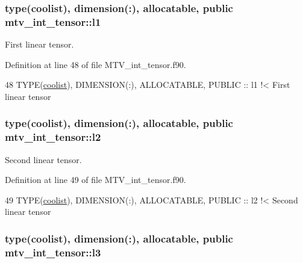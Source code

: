 \subsubsection[{\texorpdfstring{l1}{l1}}]{\setlength{\rightskip}{0pt plus 5cm}type({\bf coolist}), dimension(\+:), allocatable, public mtv\+\_\+int\+\_\+tensor\+::l1}\hypertarget{namespacemtv__int__tensor_a2dbd181e62dbbb9aedcbd6535ca56ec5}{}\label{namespacemtv__int__tensor_a2dbd181e62dbbb9aedcbd6535ca56ec5}


First linear tensor. 



Definition at line 48 of file M\+T\+V\+\_\+int\+\_\+tensor.\+f90.


\begin{DoxyCode}
48   \textcolor{keywordtype}{TYPE}(\hyperlink{structtensor_1_1coolist}{coolist}), \textcolor{keywordtype}{DIMENSION(:)}, \textcolor{keywordtype}{ALLOCATABLE}, \textcolor{keywordtype}{PUBLIC} :: l1\textcolor{comment}{   !< First linear tensor}
\end{DoxyCode}
\subsubsection[{\texorpdfstring{l2}{l2}}]{\setlength{\rightskip}{0pt plus 5cm}type({\bf coolist}), dimension(\+:), allocatable, public mtv\+\_\+int\+\_\+tensor\+::l2}\hypertarget{namespacemtv__int__tensor_aa6dcec8a4783e982cd8894a15ae210d4}{}\label{namespacemtv__int__tensor_aa6dcec8a4783e982cd8894a15ae210d4}


Second linear tensor. 



Definition at line 49 of file M\+T\+V\+\_\+int\+\_\+tensor.\+f90.


\begin{DoxyCode}
49   \textcolor{keywordtype}{TYPE}(\hyperlink{structtensor_1_1coolist}{coolist}), \textcolor{keywordtype}{DIMENSION(:)}, \textcolor{keywordtype}{ALLOCATABLE}, \textcolor{keywordtype}{PUBLIC} :: l2\textcolor{comment}{   !< Second linear tensor}
\end{DoxyCode}
\subsubsection[{\texorpdfstring{l3}{l3}}]{\setlength{\rightskip}{0pt plus 5cm}type({\bf coolist}), dimension(\+:), allocatable, public mtv\+\_\+int\+\_\+tensor\+::l3}\hypertarget{namespacemtv__int__tensor_a04155fe5ee1b9580674140eab208a7bc}{}\label{namespacemtv__int__tensor_a04155fe5ee1b9580674140eab208a7bc}


